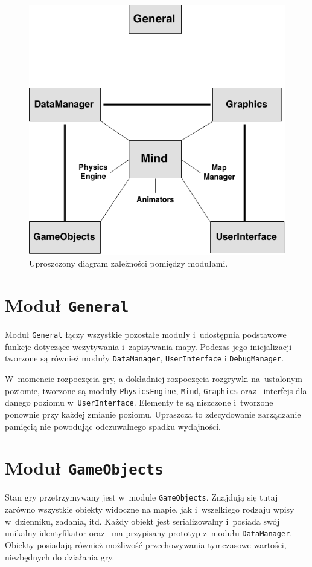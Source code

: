 \documentclass[licencjacka]{pracamgr}
\begin{document}
    \begin{figure}[htbp]
      \centering
      \includegraphics[scale=0.5]{diagram-klas.png}
      \caption{Uproszczony diagram zależności pomiędzy modułami.}
    \end{figure}

  \section{Moduł \texttt{General}}
    Moduł \texttt{General} łączy wszystkie pozostałe moduły i~udostępnia podstawowe funkcje dotyczące wczytywania i~zapisywania
    mapy. Podczas jego inicjalizacji tworzone są również moduły \texttt{DataManager}, \texttt{UserInterface} i
    \texttt{DebugManager}.

    W~momencie rozpoczęcia gry, a dokładniej rozpoczęcia rozgrywki na~ustalonym poziomie, tworzone są moduły \texttt{PhysicsEngine},
    \texttt{Mind}, \texttt{Graphics} oraz~ interfejs dla danego poziomu w~\texttt{UserInterface}. Elementy te są niszczone i~tworzone
    ponownie przy każdej zmianie poziomu. Upraszcza to zdecydowanie zarządzanie pamięcią nie powodując odczuwalnego spadku wydajności.

  \section{Moduł \texttt{GameObjects}}
    Stan gry przetrzymywany jest w~module \texttt{GameObjects}. Znajdują się tutaj zarówno wszystkie obiekty widoczne na
    mapie, jak i~wszelkiego rodzaju wpisy w~dzienniku, zadania, itd. Każdy obiekt jest serializowalny i~posiada swój unikalny
    identyfikator oraz~ ma przypisany prototyp z~modułu \texttt{DataManager}. Obiekty posiadają również możliwość przechowywania
    tymczasowe wartości, niezbędnych do działania gry.
\end{document}
